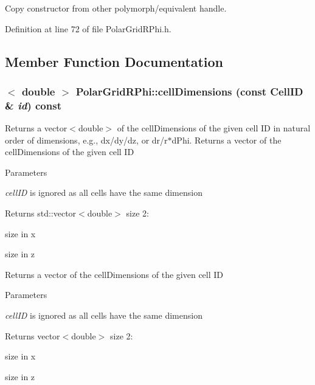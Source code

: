 Copy constructor from other polymorph/equivalent handle. 

Definition at line 72 of file PolarGridRPhi.h.

\subsection{Member Function Documentation}
\hypertarget{class_d_d4hep_1_1_geometry_1_1_polar_grid_r_phi_ab83e8e400d9232d766693ea7f52b6fb6}{
\subsubsection[{cellDimensions}]{$<$ double $>$ PolarGridRPhi::cellDimensions (const CellID \& {\em id}) const}}
\label{class_d_d4hep_1_1_geometry_1_1_polar_grid_r_phi_ab83e8e400d9232d766693ea7f52b6fb6}


Returns a vector$<$double$>$ of the cellDimensions of the given cell ID in natural order of dimensions, e.g., dx/dy/dz, or dr/r$\ast$dPhi. Returns a vector of the cellDimensions of the given cell ID 
\begin{DoxyParams}{Parameters}
\item[{\em cellID}]is ignored as all cells have the same dimension \end{DoxyParams}
\begin{DoxyReturn}{Returns}
std::vector$<$double$>$ size 2:
\begin{DoxyEnumerate}
\item size in x
\item size in z
\end{DoxyEnumerate}
\end{DoxyReturn}
Returns a vector of the cellDimensions of the given cell ID 
\begin{DoxyParams}{Parameters}
\item[{\em cellID}]is ignored as all cells have the same dimension \end{DoxyParams}
\begin{DoxyReturn}{Returns}
vector$<$double$>$ size 2:
\begin{DoxyEnumerate}
\item size in x
\item size in z 
\end{DoxyEnumerate}
\end{DoxyReturn}



